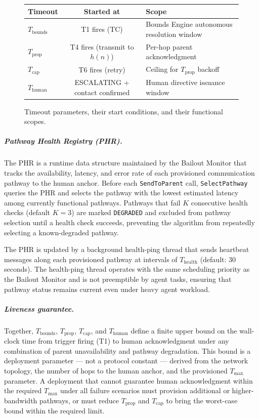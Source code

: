 \begin{figure}[htbp]
\centering
\begin{tabular}{lcl}
\hline
\textbf{Timeout} & \textbf{Started at} & \textbf{Scope} \\ \hline
$T_{\text{bounds}}$ & T1 fires (TC) & Bounds Engine autonomous resolution window \\
$T_{\text{prop}}$ & T4 fires (transmit to $h(n)$) & Per-hop parent acknowledgment \\
$T_{\text{cap}}$ & T6 fires (retry) & Ceiling for $T_{\text{prop}}$ backoff \\
$T_{\text{human}}$ & ESCALATING + contact confirmed & Human directive issuance window \\
\hline
\end{tabular}
\caption{Timeout parameters, their start conditions, and their functional scopes.}
\label{tab:timeouts}
\end{figure}

\subparagraph{Pathway Health Registry (PHR).} The PHR is a runtime data structure maintained by the Bailout Monitor that tracks the availability, latency, and error rate of each provisioned communication pathway to the human anchor. Before each \texttt{SendToParent} call, \texttt{SelectPathway} queries the PHR and selects the pathway with the lowest estimated latency among currently functional pathways. Pathways that fail $K$ consecutive health checks (default $K = 3$) are marked \texttt{DEGRADED} and excluded from pathway selection until a health check succeeds, preventing the algorithm from repeatedly selecting a known-degraded pathway.

The PHR is updated by a background health-ping thread that sends heartbeat messages along each provisioned pathway at intervals of $T_{\text{health}}$ (default: 30 seconds). The health-ping thread operates with the same scheduling priority as the Bailout Monitor and is not preemptible by agent tasks, ensuring that pathway status remains current even under heavy agent workload.

\subparagraph{Liveness guarantee.} Together, $T_{\text{bounds}}$, $T_{\text{prop}}$, $T_{\text{cap}}$, and $T_{\text{human}}$ define a finite upper bound on the wall-clock time from trigger firing (T1) to human acknowledgment under any combination of parent unavailability and pathway degradation. This bound is a deployment parameter — not a protocol constant — derived from the network topology, the number of hops to the human anchor, and the provisioned $T_{\max}$ parameter. A deployment that cannot guarantee human acknowledgment within the required $T_{\max}$ under all failure scenarios must provision additional or higher-bandwidth pathways, or must reduce $T_{\text{prop}}$ and $T_{\text{cap}}$ to bring the worst-case bound within the required limit.
